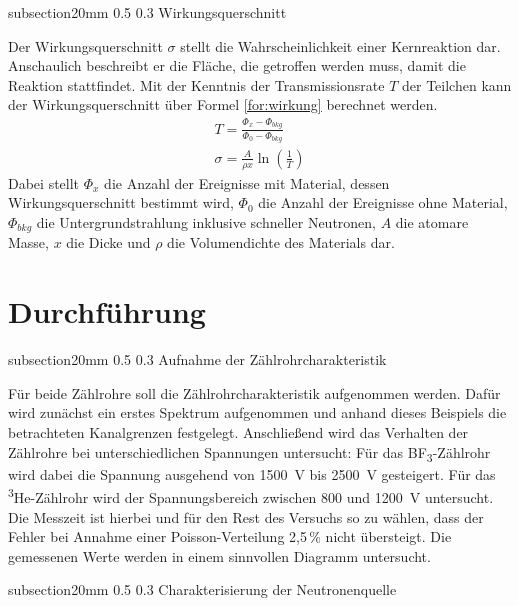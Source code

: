 \documentclass[german, %
parskip=full, %
bibliography=totoc, %
]{scrartcl}
\makeatletter
\renewcommand\subsection{\@startsection 
   {subsection}{2}{0mm}%
   {0.5\baselineskip}%
   {0.3\baselineskip}%
   {\bfseries\sffamily\large}%
   }
\makeatother
\begin{document}
\subsection{Wirkungsquerschnitt}

Der Wirkungsquerschnitt $\sigma$ stellt die Wahrscheinlichkeit einer Kernreaktion dar. Anschaulich beschreibt er die Fläche, die getroffen werden muss, damit die Reaktion stattfindet. Mit der Kenntnis der Transmissionsrate $T$ der Teilchen kann der Wirkungsquerschnitt über Formel \ref{for:wirkung} berechnet werden.
\begin{align}
T = \frac{\Phi_x - \Phi_{bkg}}{\Phi_0 - \Phi_{bkg}} \\
\sigma = \frac{A}{\rho x} \ln(\frac{1}{T}) \label{for:wirkung}
\end{align}
Dabei stellt $\Phi_x$ die Anzahl der Ereignisse mit Material, dessen Wirkungsquerschnitt bestimmt wird, $\Phi_0$ die Anzahl der Ereignisse ohne Material, $\Phi_{bkg}$ die Untergrundstrahlung inklusive schneller Neutronen, $A$ die atomare Masse, $x$ die Dicke und $\rho$ die Volumendichte des Materials dar.

\section{Durchführung}

\subsection{Aufnahme der Zählrohrcharakteristik}

Für beide Zählrohre soll die Zählrohrcharakteristik aufgenommen werden. Dafür wird zunächst ein erstes Spektrum aufgenommen und anhand dieses Beispiels die betrachteten Kanalgrenzen festgelegt. Anschließend wird das Verhalten der Zählrohre bei unterschiedlichen Spannungen untersucht: Für das BF\textsubscript{3}-Zählrohr wird dabei die Spannung ausgehend von \SI{1500}{\volt} bis \SI{2500}{\volt} gesteigert. Für das \textsuperscript{3}He-Zählrohr wird der Spannungsbereich zwischen 800 und \SI{1200}{\volt} untersucht. Die Messzeit ist hierbei und für den Rest des Versuchs so zu wählen, dass der Fehler bei Annahme einer Poisson-Verteilung 2,5\,\% nicht übersteigt. Die gemessenen Werte werden in einem sinnvollen Diagramm untersucht.

\subsection{Charakterisierung der Neutronenquelle}
\end{document}
